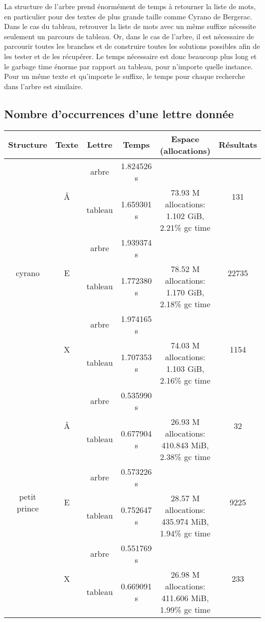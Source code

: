 \documentclass[a4paper,12pt]{article}
\begin{document}
La structure de l'arbre prend énormément de temps à retourner la liste de mots, en particulier pour des textes de plus grande taille comme Cyrano de Bergerac. 
Dans le cas du tableau, retrouver la liste de mots avec un même suffixe nécessite seulement un parcours de tableau. Or, dans le cas de l'arbre, il est nécessaire de parcourir toutes les branches et de construire toutes les solutions possibles afin de les tester et de les récupérer. Le temps nécessaire est donc beaucoup plus long et le garbage time énorme par rapport au tableau, pour n'importe quelle instance. Pour un même texte et qu'importe le suffixe, le temps pour chaque recherche dans l'arbre est similaire.

\newpage
\subsection{Nombre d'occurrences d'une lettre donnée} 

\begin{center}
  \begin{tabular}{|c|c|c|c|c|c|}
    \hline
    Structure & Texte & Lettre & Temps & Espace (allocations) & Résultats \\
    \hline
    \multirow{6}{*}{cyrano} & \multirow{2}{*}{Â} & arbre & 1.824526 s &  & \multirow{2}{*}{131}\\
    \cline{3-5}
    & & tableau & 1.659301 s & 73.93 M allocations: 1.102 GiB, 2.21\% gc time & \\
    \cline{2-6}
    & \multirow{2}{*}{E} & arbre & 1.939374 s &  & \multirow{2}{*}{22735}\\
    \cline{3-5}
    & & tableau & 1.772380 s & 78.52 M allocations: 1.170 GiB, 2.18\% gc time & \\
    \cline{2-6}
    & \multirow{2}{*}{X} & arbre & 1.974165 s &  & \multirow{2}{*}{1154}\\
    \cline{3-5}
    & & tableau & 1.707353 s & 74.03 M allocations: 1.103 GiB, 2.16\% gc time & \\
    \hline


    \multirow{6}{*}{petit prince} & \multirow{2}{*}{Â}  & arbre & 0.535990 s &  & \multirow{2}{*}{32}\\
    \cline{3-5}
    & & tableau & 0.677904 s  & 26.93 M allocations: 410.843 MiB, 2.38\% gc time  & \\
    \cline{2-6}
    & \multirow{2}{*}{E} & arbre & 0.573226 s  &  & \multirow{2}{*}{9225} \\
    \cline{3-5}
    & & tableau & 0.752647 s  & 28.57 M allocations: 435.974 MiB, 1.94\% gc time  & \\
    \cline{2-6}
    & \multirow{2}{*}{X} & arbre & 0.551769 s &  & \multirow{2}{*}{233}\\
    \cline{3-5}
    & & tableau & 0.669091 s  & 26.98 M allocations: 411.606 MiB, 1.99\% gc time  & \\
    \hline
  \end{tabular}
\end{center}
\end{document}
